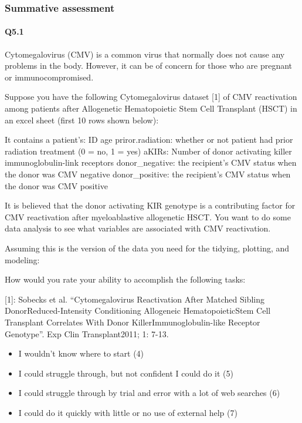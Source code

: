 \documentclass[030-workshop.tex]{subfiles}
\begin{document}
\subsubsection{Summative assessment}

    \paragraph{Q5.1}

    Cytomegalovirus (CMV) is a common virus that normally does not cause any
    problems in the body. However, it can be of concern for those who are
    pregnant or immunocompromised.

    Suppose you have the following Cytomegalovirus dataset [1] of CMV reactivation
    among patients after Allogenetic Hematopoietic Stem Cell Transplant (HSCT) in an
    excel sheet (first 10 rows shown below):

    It contains a patient's: ID age priror.radiation: whether or not patient had
    prior radiation treatment (0 = no, 1 = yes) aKIRs: Number of donor activating
    killer immunoglobulin-link receptors donor\_negative: the recipient's CMV status
    when the donor was CMV negative donor\_positive: the recipient's CMV status when
    the donor was CMV positive

    It is believed that the donor activating KIR genotype is a contributing factor
    for CMV reactivation after myeloablastive allogenetic HSCT. You want to do some
    data analysis to see what variables are associated with CMV reactivation.

    Assuming this is the version of the data you need for the tidying, plotting, and
    modeling:

    How would you rate your ability to accomplish the following tasks:

    [1]: Sobecks et al. ``Cytomegalovirus Reactivation After Matched Sibling
    DonorReduced-Intensity Conditioning Allogeneic HematopoieticStem Cell Transplant
    Correlates With Donor KillerImmunoglobulin-like Receptor Genotype''. Exp Clin
    Transplant2011; 1: 7-13.

    \begin{itemize}
        \item I wouldn't know where to start (4)
        \item I could struggle through, but not confident I could do it (5)
        \item I could struggle through by trial and error with a lot of web searches (6)
        \item I could do it quickly with little or no use of external help (7)
    \end{itemize}
\end{document}
